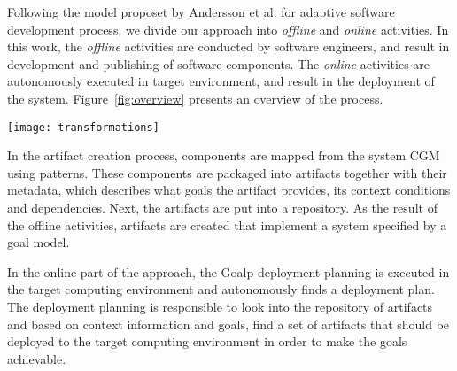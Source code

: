 \label{sec:proposal}



Following the model proposet by Andersson et al.\cite{andersson_software_2013} for adaptive software development process, we divide our approach into \emph{offline} and \emph{online} activities. In this work, the \emph{offline} activities are conducted by software engineers, and result in development and publishing of software components. The \emph{online} activities are autonomously executed in target environment, and result in the deployment of the system. Figure~\ref{fig:overview} presents an overview of the process.

\begin{figure*}[!htb]
  \centering
  \texttt{[image: transformations]}
  \caption{Activities: (1) component mapping; (2) packaging; (3) deployment planning; (4) component binding}
\label{fig:overview}
\end{figure*}


In the artifact creation process, components are mapped from the system CGM using patterns. These components are packaged into artifacts together with their metadata, which describes what goals the artifact provides, its context conditions and dependencies. Next, the artifacts are put into a repository. As the result of the offline activities, artifacts are created that implement a system specified by a goal model.

In the online part of the approach, the Goalp deployment planning is executed in the target computing environment and autonomously finds a deployment plan.
The deployment planning is responsible to look into the repository of artifacts and based on context information and goals, find a set of artifacts that should be deployed to the target computing environment in order to make the goals achievable.


